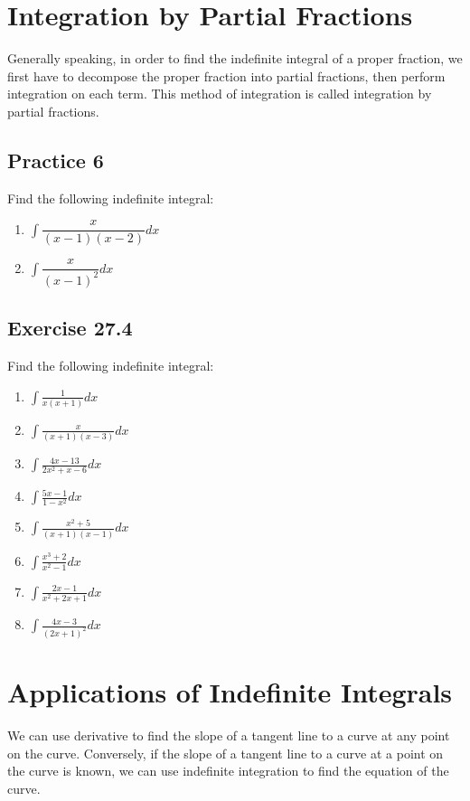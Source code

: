 \documentclass{report}
\begin{document}
\newpage
\section{Integration by Partial Fractions}

Generally speaking, in order to find the indefinite integral of a proper
fraction, we first have to decompose the proper fraction into partial
fractions, then perform integration on each term. This method of integration is
called integration by partial fractions.

\subsection{Practice 6}
Find the following indefinite integral:
\begin{enumerate}
    \item $\displaystyle\int\dfrac{x}{(x-1)(x-2)} dx$
    \item $\displaystyle\int\dfrac{x}{(x-1)^2} dx$
\end{enumerate}

\subsection{Exercise 27.4}

Find the following indefinite integral:
\begin{enumerate}
    \item $\displaystyle\int\frac{1}{x(x+1)} dx$
    \item $\displaystyle\int\frac{x}{(x+1)(x-3)} dx$
    \item $\displaystyle\int\frac{4x-13}{2x^2+x-6} dx$
    \item $\displaystyle\int\frac{5x-1}{1-x^{2}} dx$
    \item $\displaystyle\int\frac{x^{2}+5}{(x+1)(x-1)} dx$
    \item $\displaystyle\int\frac{x^{3}+2}{x^{2}-1} dx$
    \item $\displaystyle\int\frac{2x-1}{x^{2}+2x+1} dx$
    \item $\displaystyle\int\frac{4x-3}{(2x+1)^{2}} dx$
\end{enumerate}

\newpage
\section{Applications of Indefinite Integrals}

We can use derivative to find the slope of a tangent line to a curve at any
point on the curve. Conversely, if the slope of a tangent line to a curve at a
point on the curve is known, we can use indefinite integration to find the
equation of the curve.
\end{document}
